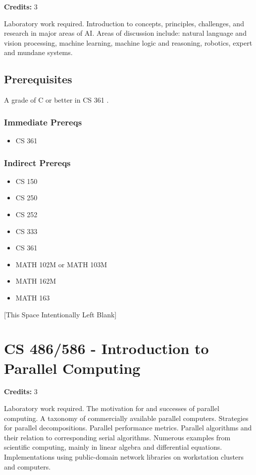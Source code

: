 \documentclass[]{article}
\providecommand{\tightlist}{%
  \setlength{\itemsep}{0pt}\setlength{\parskip}{0pt}}
\newcommand{\pagebreakhere}{
\vspace*{\fill}
\begin{center}
[This Space Intentionally Left Blank]
\end{center}
\vspace*{\fill}
\newpage
}
\begin{document}
\textbf{Credits:} 3

Laboratory work required. Introduction to concepts, principles,
challenges, and research in major areas of AI. Areas of discussion
include: natural language and vision processing, machine learning,
machine logic and reasoning, robotics, expert and mundane systems.

\subsection{Prerequisites}\label{prerequisites-48}

A grade of C or better in CS 361 .

\subsubsection{Immediate Prereqs}\label{immediate-prereqs-39}

\begin{itemize}
\tightlist
\item
  CS 361
\end{itemize}

\subsubsection{Indirect Prereqs}\label{indirect-prereqs-39}

\begin{itemize}
\tightlist
\item
  CS 150
\item
  CS 250
\item
  CS 252
\item
  CS 333
\item
  CS 361
\item
  MATH 102M or MATH 103M
\item
  MATH 162M
\item
  MATH 163
\end{itemize}

\pagebreakhere
\section{CS 486/586 - Introduction to Parallel
Computing}\label{cs-486586---introduction-to-parallel-computing}

\textbf{Credits:} 3

Laboratory work required. The motivation for and successes of parallel
computing. A taxonomy of commercially available parallel computers.
Strategies for parallel decompositions. Parallel performance metrics.
Parallel algorithms and their relation to corresponding serial
algorithms. Numerous examples from scientific computing, mainly in
linear algebra and differential equations. Implementations using
public-domain network libraries on workstation clusters and computers.
\end{document}
